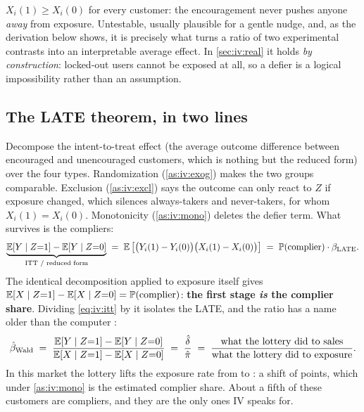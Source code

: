 \begin{assumption}\label{as:iv:mono}
$X_i(1) \ge X_i(0)$ for every customer: the encouragement never pushes anyone \emph{away} from
exposure. Untestable, usually plausible for a gentle nudge, and, as the derivation below shows,
it is precisely what turns a ratio of two experimental contrasts into an interpretable average
effect. In \cref{sec:iv:real} it holds \emph{by construction}: locked-out users cannot be exposed at
all, so a defier is a logical impossibility rather than an assumption.
\end{assumption}

\subsection*{The LATE theorem, in two lines}

Decompose the intent-to-treat effect (the average outcome difference between encouraged and
unencouraged customers, which is nothing but the reduced form) over the four types.
Randomization (\cref{as:iv:exog}) makes the two groups comparable. Exclusion
(\cref{as:iv:excl}) says the outcome can only react to $Z$ if exposure changed, which silences
always-takers and never-takers, for whom $X_i(1) = X_i(0)$. Monotonicity (\cref{as:iv:mono})
deletes the defier term. What survives is the compliers:
%
\begin{equation}
  \underbrace{\operatorname{\mathbb{E}}[Y \mid Z{=}1] - \operatorname{\mathbb{E}}[Y \mid Z{=}0]}_{\text{ITT / reduced form}}
  \;=\; \operatorname{\mathbb{E}}\big[\big(Y_i(1) - Y_i(0)\big)\big(X_i(1) - X_i(0)\big)\big]
  \;=\; \operatorname{\mathbb{P}}(\text{complier}) \cdot \beta_{\text{LATE}} .
  \label{eq:iv:itt}
\end{equation}
%
The identical decomposition applied to exposure itself gives
$\operatorname{\mathbb{E}}[X \mid Z{=}1] - \operatorname{\mathbb{E}}[X \mid Z{=}0] = \operatorname{\mathbb{P}}(\text{complier})$: \textbf{the first stage
\emph{is} the complier share}. Dividing \cref{eq:iv:itt} by it isolates the LATE, and the ratio has
a name older than the computer \citep{wright1928}:
%
\begin{equation}
  \hat\beta_{\text{Wald}}
  \;=\; \frac{\operatorname{\mathbb{E}}[Y \mid Z{=}1] - \operatorname{\mathbb{E}}[Y \mid Z{=}0]}{\operatorname{\mathbb{E}}[X \mid Z{=}1] - \operatorname{\mathbb{E}}[X \mid Z{=}0]}
  \;=\; \frac{\hat\delta}{\hat\pi}
  \;=\; \frac{\text{what the lottery did to sales}}{\text{what the lottery did to exposure}} .
  \label{eq:iv:wald}
\end{equation}
%
In this market the lottery lifts the exposure rate from \pc{\nbElevenFsLo} to \pc{\nbElevenFsHi}: a
shift of \nbElevenFsShift{} points, which under \cref{as:iv:mono} is the estimated complier share.
About a fifth of these customers are compliers, and they are the only ones IV speaks for.

